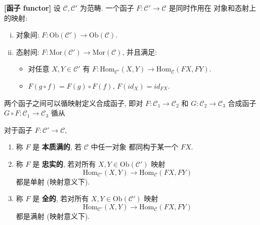 \documentclass[UTF8]{book}
\begin{document}
\begin{definition}
    \textbf{[函子 functor]} 设 $\mathcal{C},\mathcal{C}'$ 为范畴. 
    一个函子 $F:\mathcal{C}' \to \mathcal{C}$ 是同时作用在
    对象和态射上的映射: 
    \begin{enumerate}[(i)]
        \item 对象间: 
        $F: \mathrm{Ob}(\mathcal{C}')\to \mathrm{Ob}(\mathcal{C})$. 
        \item 态射间: 
        $F: \mathrm{Mor}(\mathcal{C}')\to \mathrm{Mor}(\mathcal{C})$, 
        并且满足: 
        \begin{itemize}
            \item 对任意 $X,Y \in \mathcal{C}'$ 有 
            $ F: \mathrm{Hom}_{\mathcal{C}'}(X,Y) \to \mathrm{Hom}_{\mathcal{C}}(FX,FY)$. 
            \item $F(g\circ f) = F(g) \circ F(f)$, $F(id_X) = id_{FX}$.
        \end{itemize}
    \end{enumerate}
    两个函子之间可以循映射定义合成函子, 即对 
    $F:\mathcal{C}_1 \to \mathcal{C}_2$ 和 $G:\mathcal{C}_2 \to \mathcal{C}_3$ 
    合成函子 $G \circ F :\mathcal{C}_1 \to \mathcal{C}_3$ 循从 
    \begin{center}

    \end{center}

    对于函子 $F:\mathcal{C}' \to \mathcal{C}$, 
    \begin{enumerate}[(1)]
        \item 称 $F$ 是 \textbf{本质满的}, 若 $\mathcal{C}$ 中任一对象
        都同构于某一个 $FX$. 
        \item 称 $F$ 是 \textbf{忠实的}, 若对所有 $X,Y \in \mathrm{Ob}(\mathcal{C}')$ 
        映射 $$ \mathrm{Hom}_{\mathcal{C}'}(X,Y) \to \mathrm{Hom}_{\mathcal{C}}(FX,FY)$$ 
        都是单射 (映射意义下). 
        \item 称 $F$ 是 \textbf{全的}, 若对所有 $X,Y \in \mathrm{Ob}(\mathcal{C}')$ 
        映射 $$ \mathrm{Hom}_{\mathcal{C}'}(X,Y) \to \mathrm{Hom}_{\mathcal{C}}(FX,FY)$$ 
        都是满射 (映射意义下). 
    \end{enumerate}
\end{definition}
\end{document}
